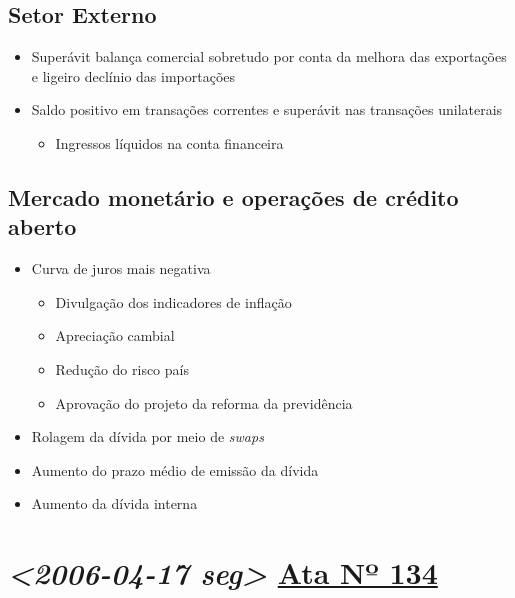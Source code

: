 \documentclass[11pt]{article}
\begin{document}
\subsection*{Setor Externo}
\label{sec:org296c2f6}
\begin{itemize}
\item Superávit balança comercial sobretudo por conta da melhora das exportações e ligeiro declínio das importações
\item Saldo positivo em transações correntes e superávit nas transações unilaterais
\begin{itemize}
\item Ingressos líquidos na conta financeira
\end{itemize}
\end{itemize}
\subsection*{Mercado monetário e operações de crédito aberto}
\label{sec:org8edf8d5}
\begin{itemize}
\item Curva de juros mais negativa
\begin{itemize}
\item Divulgação dos indicadores de inflação
\item Apreciação cambial
\item Redução do risco país
\item Aprovação do projeto da reforma da previdência
\end{itemize}
\item Rolagem da dívida por meio de \emph{swaps}
\item Aumento do prazo médio de emissão da dívida
\item Aumento da dívida interna
\end{itemize}

\section*{\textit{<2006-04-17 seg> } \href{https://www.bcb.gov.br/publicacoes/atascopom/24042008}{Ata Nº 134}}
\label{sec:orgab5601a}
\end{document}
